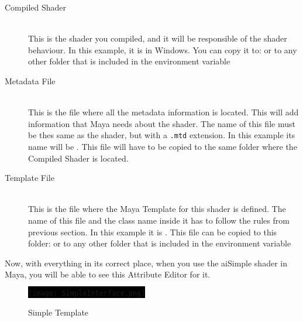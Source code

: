 \begin{description}

\item[Compiled Shader] \hfill \\
This is the shader you compiled, and it will be responsible of the shader behaviour. In this example, it is 
in Windows. You can copy it to:
 or to any other folder that is included in the environment variable
\\

\item[Metadata File] \hfill \\
This is the file where all the metadata information is located. This will add information that Maya needs about the shader. The name of this file must be thes same as the shader,
but with a \texttt{.mtd} extension. In this example its name will be . This file will have to be copied to the same folder
where the Compiled Shader is located.\\

\item[Template File] \hfill \\
This is the file where the Maya Template for this shader is defined. The name of this file and the class name inside it has to follow the rules from previous section.
In this example it is . This file can be copied to this folder:
or to any other folder that is included in the environment variable
\\

\end{description}

Now, with everything in its correct place, when you use the aiSimple shader in Maya, you will be able to see this Attribute Editor for it.

\begin{figure}[H]
\centering
\colorbox{black}{\texttt{[image: SimpleInterface.png]}}
\caption{Simple Template}
\label{SimpleTemplate}
\end{figure}

